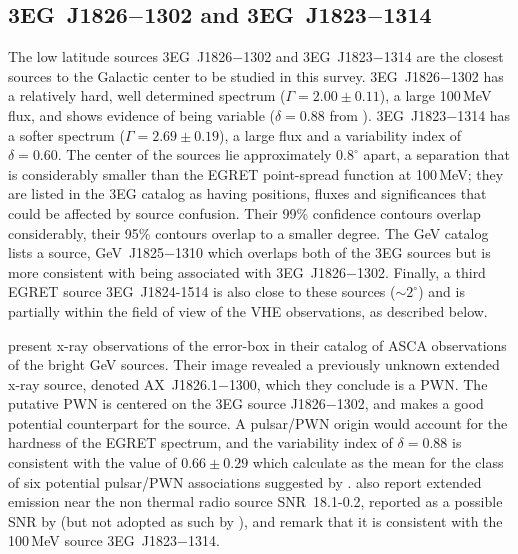 \subsection{3EG~J1826$-$1302 and 3EG~J1823$-$1314}

The low latitude \Gray sources 3EG~J1826$-$1302 and 3EG~J1823$-$1314
are the closest sources to the Galactic center to be studied in this
survey. 3EG~J1826$-$1302 has a relatively hard, well determined
spectrum ($\Gamma=2.00\pm0.11$), a large 100\,MeV flux, and shows
evidence of being variable ($\delta=0.88$ from
\citealt{REF::NOLAN::APJ2003}). 3EG~J1823$-$1314 has a softer spectrum
($\Gamma=2.69\pm0.19$), a large flux and a variability index of
$\delta=0.60$. The center of the sources lie approximately $0.8^\circ$
apart, a separation that is considerably smaller than the EGRET
point-spread function at 100\,MeV; they are listed in the 3EG catalog
as having positions, fluxes and significances that could be affected
by source confusion. Their 99\% confidence contours overlap
considerably, their 95\% contours overlap to a smaller degree. The GeV
catalog lists a source, GeV~J1825$-$1310 which overlaps both of the
3EG sources but is more consistent with being associated with
3EG~J1826$-$1302. Finally, a third EGRET source 3EG~J1824-1514 is also
close to these sources ($\sim2^\circ$) and is partially within
the field of view of the VHE observations, as described below.

\citet{REF::ROBERTS::APJS2001} present x-ray observations of the
\Gray error-box in their catalog of ASCA observations of 
the bright GeV sources. Their image revealed a previously unknown
extended x-ray source, denoted AX~J1826.1$-$1300, which they conclude
is a PWN. The putative PWN is centered on the 3EG source J1826$-$1302,
and makes a good potential counterpart for the \Gray source. A
pulsar/PWN origin would account for the hardness of the EGRET
spectrum, and the variability index of $\delta=0.88$ is consistent
with the value of $0.66\pm0.29$ which \citet{REF::NOLAN::APJ2003}
calculate as the mean for the class of six potential pulsar/PWN
associations suggested by \citet{REF::GRENIER::TEXAS2002}.
\citet{REF::ROBERTS::APJS2001} also report extended emission near the 
non thermal radio source SNR~18.1-0.2, reported as a possible SNR by
\citet{REF::ODEGARD::AJ1986} (but not adopted as such by
\citealt{REF::GREEN::WEB2001}), and remark that it is consistent with
the 100\,MeV source 3EG~J1823$-$1314.

